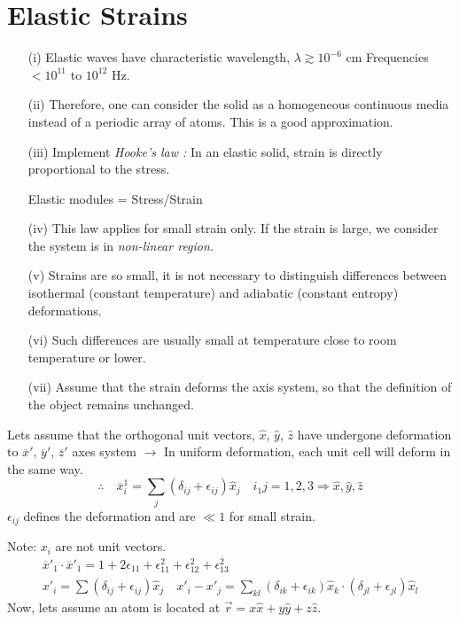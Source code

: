 \section*{Elastic Strains}
\begin{itemize}
\item[(i)] Elastic waves have characteristic wavelength, $\lambda \gtrsim 10^{-6}$ cm Frequencies $<10^{11}$ to $10^{12}$ Hz.

\item[(ii)] Therefore, one can consider the solid as a homogeneous continuous media instead of a periodic array of atoms. This is a good approximation.

\item[(iii)] Implement {\em Hooke's law :} In an elastic solid, strain is directly proportional to the stress.

Elastic modules = Stress/Strain

\item[(iv)] This law applies for small strain only. If the strain is large, we consider the system is in {\em non-linear region.}

\item[(v)] Strains are so small, it is not necessary to distinguish differences between isothermal (constant temperature) and adiabatic (constant entropy) deformations. 

\item[(vi)] Such differences are usually small at temperature close to room temperature or lower.

\item[(vii)] Assume that the strain deforms the axis system, so that the definition of the object remains unchanged.
\end{itemize}

Lets assume that the orthogonal unit vectors, $\widehat{x}$, $\widehat{y}$, $\widehat{z}$ have undergone deformation to $\overline{x}'$, $\overline{y}'$, $\overline{z}'$ axes system $\to$ In uniform deformation, each unit cell will deform in the same way.
$$
\therefore\quad \overline{x}^{1}_{i}=\sum\limits_{j}(\delta_{ij}+\epsilon_{ij})\widehat{x}_{j}\quad i_{1}j=1,2,3\Rightarrow \widehat{x}, \widehat{y}, \widehat{z}
$$
$\epsilon_{ij}$ defines the deformation and are $\ll 1$ for small strain.

Note: $x_{i}$ are not unit vectors.
\begin{gather*}
\overline{x}'_{1}\cdot \overline{x}'_{1}=1+2\epsilon_{11}+\epsilon^{2}_{11}+\epsilon^{2}_{12}+\epsilon^{2}_{13}\\
x'_{i}=\sum(\delta_{ij}+\epsilon_{ij})\widehat{x}_{j}\quad x'_{i}-x'_{j}=\sum\limits_{kl}(\delta_{ik}+\epsilon_{ik})\widehat{x}_{k}\cdot (\delta_{jl}+\epsilon_{jl})\widehat{x}_{l}
\end{gather*}
Now, lets assume an atom is located at $\overrightarrow{r}=x\widehat{x}+y\widehat{y}+z\widehat{z}$.


